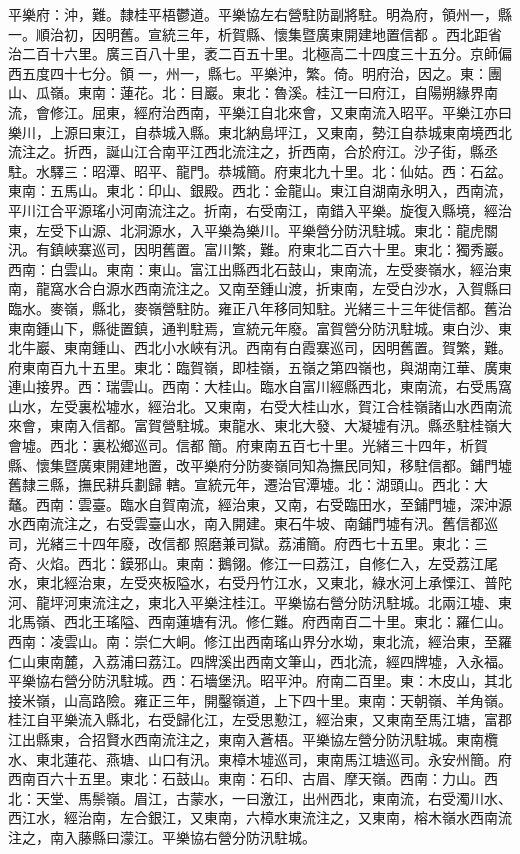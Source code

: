 \begin{pinyinscope}
平樂府：沖，難。隸桂平梧鬱道。平樂協左右營駐防副將駐。明為府，領州一，縣一。順治初，因明舊。宣統三年，析賀縣、懷集暨廣東開建地置信都。西北距省治二百十六里。廣三百八十里，袤二百五十里。北極高二十四度三十五分。京師偏西五度四十七分。領一，州一，縣七。平樂沖，繁。倚。明府治，因之。東：團山、瓜嶺。東南：蓮花。北：目巖。東北：魯溪。桂江一曰府江，自陽朔緣界南流，會修江。屈東，經府治西南，平樂江自北來會，又東南流入昭平。平樂江亦曰樂川，上源曰東江，自恭城入縣。東北納島坪江，又東南，勢江自恭城東南境西北流注之。折西，誕山江合南平江西北流注之，折西南，合於府江。沙子街，縣丞駐。水驛三：昭潭、昭平、龍門。恭城簡。府東北九十里。北：仙姑。西：石盆。東南：五馬山。東北：印山、銀殿。西北：金龍山。東江自湖南永明入，西南流，平川江合平源瑤小河南流注之。折南，右受南江，南錯入平樂。旋復入縣境，經治東，左受下山源、北洞源水，入平樂為樂川。平樂營分防汛駐城。東北：龍虎關汛。有鎮峽寨巡司，因明舊置。富川繁，難。府東北二百六十里。東北：獨秀巖。西南：白雲山。東南：東山。富江出縣西北石鼓山，東南流，左受麥嶺水，經治東南，龍窩水合白源水西南流注之。又南至鍾山渡，折東南，左受白沙水，入賀縣曰臨水。麥嶺，縣北，麥嶺營駐防。雍正八年移同知駐。光緒三十三年徙信都。舊治東南鍾山下，縣徙置鎮，通判駐焉，宣統元年廢。富賀營分防汛駐城。東白沙、東北牛巖、東南鍾山、西北小水峽有汛。西南有白霞寨巡司，因明舊置。賀繁，難。府東南百九十五里。東北：臨賀嶺，即桂嶺，五嶺之第四嶺也，與湖南江華、廣東連山接界。西：瑞雲山。西南：大桂山。臨水自富川經縣西北，東南流，右受馬窩山水，左受裏松墟水，經治北。又東南，右受大桂山水，賀江合桂嶺諸山水西南流來會，東南入信都。富賀營駐城。東龍水、東北大發、大凝墟有汛。縣丞駐桂嶺大會墟。西北：裏松鄉巡司。信都簡。府東南五百七十里。光緒三十四年，析賀縣、懷集暨廣東開建地置，改平樂府分防麥嶺同知為撫民同知，移駐信都。鋪門墟舊隸三縣，撫民耕兵劃歸轄。宣統元年，遷治官潭墟。北：湖頭山。西北：大鼇。西南：雲臺。臨水自賀南流，經治東，又南，右受臨田水，至鋪門墟，深沖源水西南流注之，右受雲臺山水，南入開建。東石牛坡、南鋪門墟有汛。舊信都巡司，光緒三十四年廢，改信都照磨兼司獄。荔浦簡。府西七十五里。東北：三奇、火焰。西北：鏌邪山。東南：鵝翎。修江一曰荔江，自修仁入，左受荔江尾水，東北經治東，左受夾板隘水，右受丹竹江水，又東北，綠水河上承慄江、普陀河、龍坪河東流注之，東北入平樂注桂江。平樂協右營分防汛駐城。北兩江墟、東北馬嶺、西北王瑤隘、西南蓮塘有汛。修仁難。府西南百二十里。東北：羅仁山。西南：凌雲山。南：崇仁大峒。修江出西南瑤山界分水坳，東北流，經治東，至羅仁山東南麓，入荔浦曰荔江。四牌溪出西南文筆山，西北流，經四牌墟，入永福。平樂協右營分防汛駐城。西：石墻堡汛。昭平沖。府南二百里。東：木皮山，其北接米嶺，山高路險。雍正三年，開鑿嶺道，上下四十里。東南：天朝嶺、羊角嶺。桂江自平樂流入縣北，右受歸化江，左受思懃江，經治東，又東南至馬江塘，富郡江出縣東，合招賢水西南流注之，東南入蒼梧。平樂協左營分防汛駐城。東南欖水、東北蓮花、燕塘、山口有汛。東樟木墟巡司，東南馬江塘巡司。永安州簡。府西南百六十五里。東北：石鼓山。東南：石印、古眉、摩天嶺。西南：力山。西北：天堂、馬鬃嶺。眉江，古蒙水，一曰激江，出州西北，東南流，右受濁川水、西江水，經治南，左合銀江，又東南，六樟水東流注之，又東南，榕木嶺水西南流注之，南入藤縣曰濛江。平樂協右營分防汛駐城。


\end{pinyinscope}
